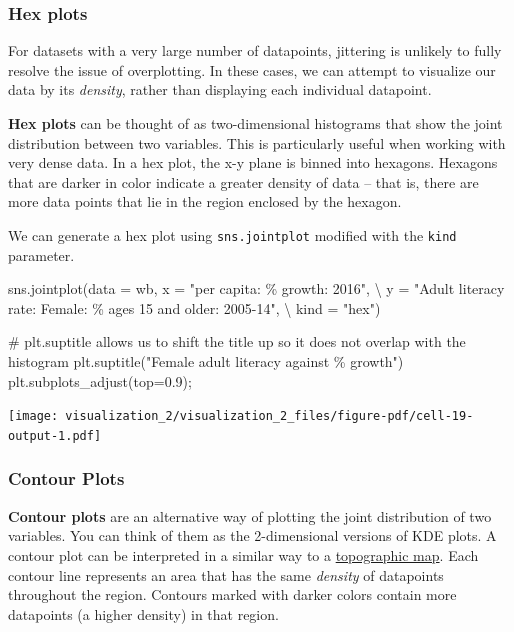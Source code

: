 \documentclass[
  letterpaper,
  DIV=11,
  numbers=noendperiod]{scrreprt}
\newenvironment{Shaded}{\begin{snugshade}}{\end{snugshade}}
\newcommand{\CommentTok}[1]{\textcolor[rgb]{0.37,0.37,0.37}{#1}}
\newcommand{\FloatTok}[1]{\textcolor[rgb]{0.68,0.00,0.00}{#1}}
\newcommand{\NormalTok}[1]{\textcolor[rgb]{0.00,0.23,0.31}{#1}}
\newcommand{\OperatorTok}[1]{\textcolor[rgb]{0.37,0.37,0.37}{#1}}
\newcommand{\SpecialCharTok}[1]{\textcolor[rgb]{0.37,0.37,0.37}{#1}}
\newcommand{\StringTok}[1]{\textcolor[rgb]{0.13,0.47,0.30}{#1}}
\begin{document}
\subsubsection{Hex plots}\label{hex-plots}

For datasets with a very large number of datapoints, jittering is
unlikely to fully resolve the issue of overplotting. In these cases, we
can attempt to visualize our data by its \emph{density}, rather than
displaying each individual datapoint.

\textbf{Hex plots} can be thought of as two-dimensional histograms that
show the joint distribution between two variables. This is particularly
useful when working with very dense data. In a hex plot, the x-y plane
is binned into hexagons. Hexagons that are darker in color indicate a
greater density of data -- that is, there are more data points that lie
in the region enclosed by the hexagon.

We can generate a hex plot using \texttt{sns.jointplot} modified with
the \texttt{kind} parameter.

\begin{Shaded}
\begin{Highlighting}[]
\NormalTok{sns.jointplot(data }\OperatorTok{=}\NormalTok{ wb, x }\OperatorTok{=} \StringTok{"per capita: }\SpecialCharTok{\% g}\StringTok{rowth: 2016"}\NormalTok{, }\OperatorTok{\textbackslash{}}
\NormalTok{              y }\OperatorTok{=} \StringTok{"Adult literacy rate: Female: \% ages 15 and older: 2005{-}14"}\NormalTok{, }\OperatorTok{\textbackslash{}}
\NormalTok{              kind }\OperatorTok{=} \StringTok{"hex"}\NormalTok{)}

\CommentTok{\# plt.suptitle allows us to shift the title up so it does not overlap with the histogram}
\NormalTok{plt.suptitle(}\StringTok{"Female adult literacy against }\SpecialCharTok{\% g}\StringTok{rowth"}\NormalTok{)}
\NormalTok{plt.subplots\_adjust(top}\OperatorTok{=}\FloatTok{0.9}\NormalTok{)}\OperatorTok{;}
\end{Highlighting}
\end{Shaded}

\texttt{[image: visualization\_2/visualization\_2\_files/figure-pdf/cell-19-output-1.pdf]}

\subsubsection{Contour Plots}\label{contour-plots}

\textbf{Contour plots} are an alternative way of plotting the joint
distribution of two variables. You can think of them as the
2-dimensional versions of KDE plots. A contour plot can be interpreted
in a similar way to a
\href{https://gisgeography.com/contour-lines-topographic-map/}{topographic
map}. Each contour line represents an area that has the same
\emph{density} of datapoints throughout the region. Contours marked with
darker colors contain more datapoints (a higher density) in that region.
\end{document}
